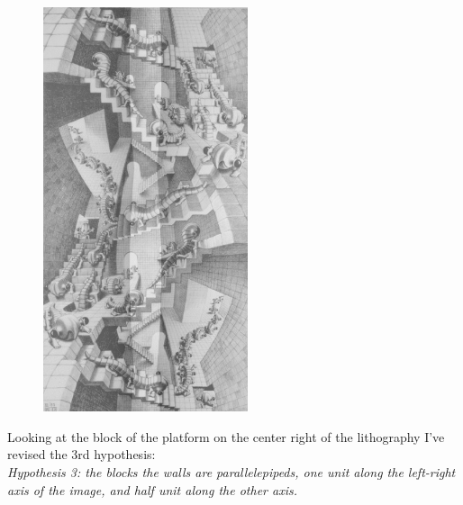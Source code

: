 \documentclass[12pt, a4paper]{article}
\begin{document}
\begin{center}
\begin{figure}[H]
\centering\includegraphics[width=6cm]{./checkDimensionViewPoint_1.png}\\
\end{figure}
\end{center}

Looking at the block of the platform on the center right of the lithography I've revised the 3rd hypothesis:\\

\emph{Hypothesis 3: the blocks the walls are parallelepipeds, one unit along the left-right axis of the image, and half unit along the other axis.}\\
\end{document}
